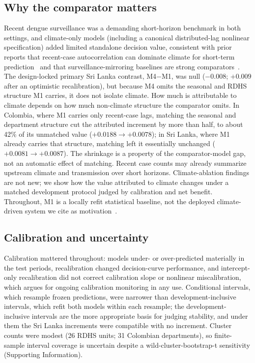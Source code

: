 \documentclass[11pt,a4paper]{article}
\begin{document}
\subsection*{Why the comparator matters}
Recent dengue surveillance was a demanding short-horizon benchmark in both settings, and climate-only models (including a canonical distributed-lag nonlinear specification) added limited standalone decision value, consistent with prior reports that recent-case autocorrelation can dominate climate for short-term prediction~\cite{Johansson2016,Benedum2020,Sesay2026} and that surveillance-mirroring baselines are strong comparators~\cite{Lowe2013}. The design-locked primary Sri Lanka contrast, M4$-$M1, was null ($-0.008$; $+0.009$ after an optimistic recalibration), but because M4 omits the seasonal and RDHS structure M1 carries, it does not isolate climate. How much is attributable to climate depends on how much non-climate structure the comparator omits. In Colombia, where M1 carries only recent-case lags, matching the seasonal and department structure cut the attributed increment by more than half, to about 42\% of its unmatched value ($+0.0188 \to +0.0078$); in Sri Lanka, where M1 already carries that structure, matching left it essentially unchanged ($+0.0081 \to +0.0087$). The shrinkage is a property of the comparator-model gap, not an automatic effect of matching. Recent case counts may already summarize upstream climate and transmission over short horizons. Climate-ablation findings are not new; we show how the value attributed to climate changes under a matched development protocol judged by calibration and net benefit. Throughout, M1 is a locally refit statistical baseline, not the deployed climate-driven system we cite as motivation~\cite{EWARScsd}.

\subsection*{Calibration and uncertainty}
Calibration mattered throughout: models under- or over-predicted materially in the test periods, recalibration changed decision-curve performance, and intercept-only recalibration did not correct calibration slope or nonlinear miscalibration, which argues for ongoing calibration monitoring in any use. Conditional intervals, which resample frozen predictions, were narrower than development-inclusive intervals, which refit both models within each resample; the development-inclusive intervals are the more appropriate basis for judging stability, and under them the Sri Lanka increments were compatible with no increment. Cluster counts were modest (26 RDHS units; 31 Colombian departments), so finite-sample interval coverage is uncertain despite a wild-cluster-bootstrap-t sensitivity (Supporting Information).
\end{document}

